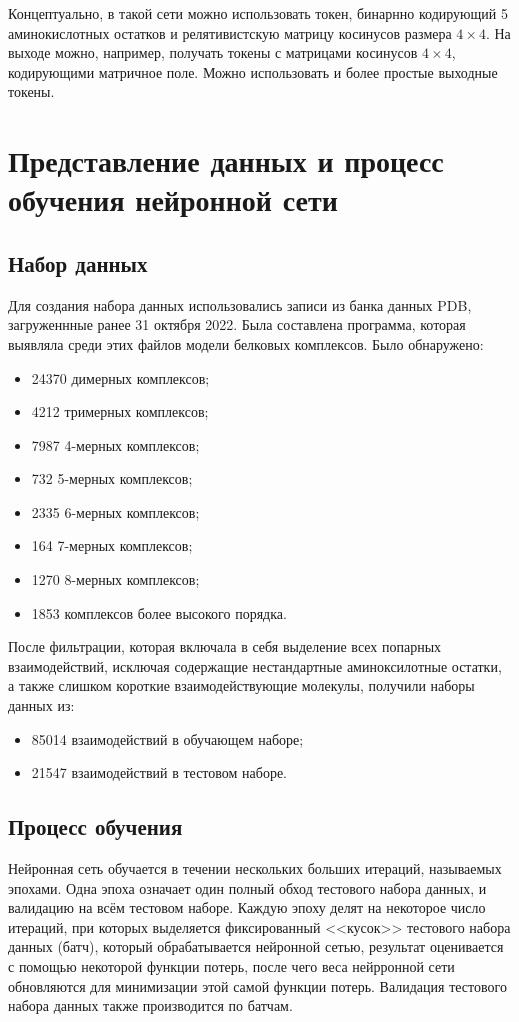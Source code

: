Концептуально, в такой сети можно использовать токен, бинарнно кодирующий 5 аминокислотных остатков и релятивистскую матрицу косинусов размера $4\times4$. На выходе можно, например, получать токены с матрицами косинусов $4\times4$, кодирующими матричное поле. Можно использовать и более простые выходные токены.

\section{Представление данных и процесс обучения нейронной сети}

\subsection{Набор данных}

Для создания набора данных использовались записи из банка данных PDB, загруженнные ранее 31 октября 2022. Была составлена программа, которая выявляла среди этих файлов модели белковых комплексов.
Было обнаружено:
\begin{itemize}
\item 24370 димерных комплексов;
\item 4212 тримерных комплексов;
\item 7987 4-мерных комплексов;
\item 732 5-мерных комплексов;
\item 2335 6-мерных комплексов;
\item 164 7-мерных комплексов;
\item 1270 8-мерных комплексов;
\item 1853 комплексов более высокого порядка.
\end{itemize}

После фильтрации, которая включала в себя выделение всех попарных взаимодействий, исключая содержащие нестандартные аминоксилотные остатки, а также слишком короткие взаимодействующие молекулы, получили наборы данных из:
\begin{itemize}
\item 85014 взаимодействий в обучающем наборе; 
\item 21547 взаимодействий в тестовом наборе.
\end{itemize}

\subsection{Процесс обучения}
Нейронная сеть обучается в течении нескольких больших итераций, называемых эпохами. Одна эпоха означает один полный обход тестового набора данных, и валидацию на всём тестовом наборе. Каждую эпоху делят на некоторое число итераций, при которых выделяется фиксированный <<кусок>> тестового набора данных (батч), который обрабатывается нейронной сетью, результат оценивается с помощью некоторой функции потерь, после чего веса нейрронной сети обновляются для минимизации этой самой функции потерь. Валидация тестового набора данных также производится по батчам.

